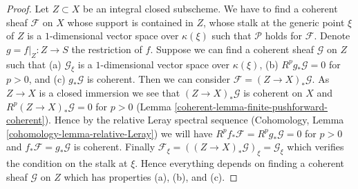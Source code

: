\begin{proof}
\medskip\noindent
Let $Z \subset X$ be an integral closed subscheme.
We have to find a coherent sheaf $\mathcal{F}$ on $X$ whose support is
contained in $Z$, whose stalk at the generic point $\xi$ of $Z$ is a
$1$-dimensional vector space over $\kappa(\xi)$ such that $\mathcal{P}$
holds for $\mathcal{F}$. Denote $g = f|_Z : Z \to S$ the restriction of $f$.
Suppose we can find a coherent sheaf $\mathcal{G}$ on $Z$ such
that
(a) $\mathcal{G}_\xi$ is a $1$-dimensional vector space over $\kappa(\xi)$,
(b) $R^pg_*\mathcal{G} = 0$ for $p > 0$, and
(c) $g_*\mathcal{G}$ is coherent. Then we can consider
$\mathcal{F} = (Z \to X)_*\mathcal{G}$. As $Z \to X$ is a closed immersion
we see that $(Z \to X)_*\mathcal{G}$ is coherent on $X$
and $R^p(Z \to X)_*\mathcal{G} = 0$ for $p > 0$
(Lemma \ref{coherent-lemma-finite-pushforward-coherent}).
Hence by the relative Leray spectral sequence
(Cohomology, Lemma \ref{cohomology-lemma-relative-Leray})
we will have $R^pf_*\mathcal{F} = R^pg_*\mathcal{G} = 0$ for $p > 0$
and $f_*\mathcal{F} = g_*\mathcal{G}$ is coherent.
Finally $\mathcal{F}_\xi = ((Z \to X)_*\mathcal{G})_\xi = \mathcal{G}_\xi$
which verifies the condition on the stalk at $\xi$.
Hence everything depends on finding a coherent sheaf $\mathcal{G}$
on $Z$ which has properties (a), (b), and (c).


\end{proof}
